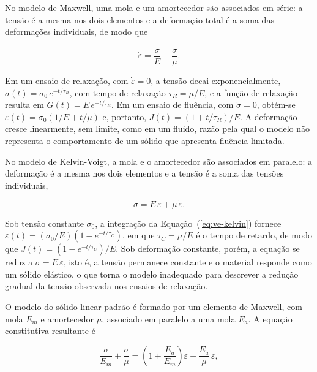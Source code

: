 \documentclass[arial,centeredequations,english,brazilian,oneside,section=TITLE]{ifes8}
\begin{document}
No modelo de Maxwell, uma mola e um amortecedor são associados em série: a tensão é a
mesma nos dois elementos e a deformação total é a soma das deformações individuais, de
modo que

\begin{equation}
  \label{eq:ve-maxwell}
  \dot{\varepsilon} = \frac{\dot{\sigma}}{E} + \frac{\sigma}{\mu}.
\end{equation}

Em um ensaio de relaxação, com $\dot{\varepsilon} = 0$, a tensão decai
exponencialmente, $\sigma(t) = \sigma_0\,e^{-t/\tau_R}$, com tempo de relaxação
$\tau_R = \mu/E$, e a função de relaxação resulta em $G(t) = E\,e^{-t/\tau_R}$.
Em um ensaio de fluência, com $\dot{\sigma} = 0$, obtém-se
$\varepsilon(t) = \sigma_0\left(1/E + t/\mu\right)$ e, portanto,
$J(t) = \left(1 + t/\tau_R\right)/E$. A deformação cresce
linearmente, sem limite, como em um fluido, razão pela qual o modelo não representa o
comportamento de um sólido que apresenta fluência limitada.

No modelo de Kelvin-Voigt, a mola e o amortecedor são associados em paralelo: a
deformação é a mesma nos dois elementos e a tensão é a soma das tensões individuais,

\begin{equation}
  \label{eq:ve-kelvin}
  \sigma = E\,\varepsilon + \mu\,\dot{\varepsilon}.
\end{equation}

Sob tensão constante $\sigma_0$, a integração da Equação~(\ref{eq:ve-kelvin}) fornece
$\varepsilon(t) = \left(\sigma_0/E\right)\left(1 - e^{-t/\tau_C}\right)$, em que
$\tau_C = \mu/E$ é o tempo de retardo, de modo que
$J(t) = \left(1 - e^{-t/\tau_C}\right)/E$. Sob deformação
constante, porém, a equação se reduz a $\sigma = E\,\varepsilon$, isto é, a tensão
permanece constante e o material responde como um sólido elástico, o que torna o modelo
inadequado para descrever a redução gradual da tensão observada nos ensaios de relaxação.

O modelo do sólido linear padrão é formado por um elemento de Maxwell, com mola $E_m$ e
amortecedor $\mu$, associado em paralelo a uma mola $E_a$. A
equação constitutiva resultante é

\begin{equation}
  \label{eq:ve-sls}
  \frac{\dot{\sigma}}{E_m} + \frac{\sigma}{\mu}
  = \left(1 + \frac{E_a}{E_m}\right)\dot{\varepsilon} + \frac{E_a}{\mu}\,\varepsilon,
\end{equation}
\end{document}
